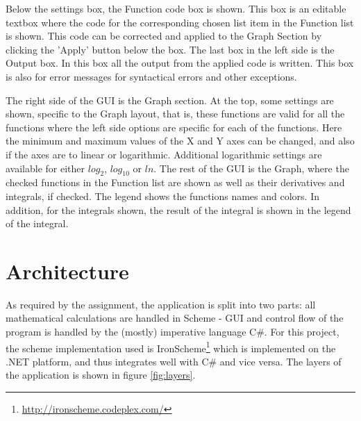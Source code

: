 \documentclass[a4paper,12pt]{article}
\begin{document}
Below the settings box, the Function code box is shown. This box is an editable textbox where the code for the corresponding chosen list item in the Function list is shown. This code can be corrected and applied to the Graph Section by clicking the 'Apply' button below the box. 
The last box in the left side is the Output box. In this box all the output from the applied code is written. This box is also for error messages for syntactical errors and other exceptions.

The right side of the GUI is the Graph section. At the top, some settings are shown, specific to the Graph layout, that is, these functions are valid for all the functions where the left side options are specific for each of the functions. Here the minimum and maximum values of the X and Y axes can be changed, and also if the axes are to linear or logarithmic. Additional logarithmic settings are available for either $log_2$, $log_{10}$ or $ln$.
The rest of the GUI is the Graph, where the checked functions in the Function list are shown as well as their derivatives and integrals, if checked. The legend shows the functions names and colors. In addition, for the integrals shown, the result of the integral is shown in the legend of the integral.

\section{Architecture}

As required by the assignment, the application is split into two parts: all mathematical calculations are handled in Scheme -  GUI and control flow of the program is handled by the (mostly) imperative language C\#. For this project, the scheme implementation used is IronScheme\footnote{\url{http://ironscheme.codeplex.com/}} which is implemented on the .NET platform, and thus integrates well with C\# and vice versa. The layers of the application is shown in figure \ref{fig:layers}.
\end{document}
